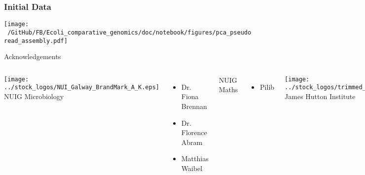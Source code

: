 \documentclass[10pt, compress]{beamer}
\begin{document}
\begin{frame}[fragile]
  \frametitle{Initial Data}
  \texttt{[image: ~/GitHub/FB/Ecoli\_comparative\_genomics/doc/notebook/figures/pca\_pseudoread\_assembly.pdf]}
\end{frame}


\begin{frame}
%

\end{frame}

\begin{frame}{Acknowledgements}
  \begin{columns}[onlytextwidth]
    \texttt{[image: ../stock\_logos/NUI\_Galway\_BrandMark\_A\_K.eps]}\\
     NUIG Microbiology
      \begin{itemize}
        \item Dr. Fiona Brennan
        \item Dr. Florence Abram
        \item Matthias Waibel
      \end{itemize}
      NUIG Maths
      \begin{itemize}
        \item Pilib
      \end{itemize}

    \texttt{[image: ../stock\_logos/trimmed\_jhi.png]}\\
      James Hutton Institute
      \begin{itemize}
        \item Leighton Pritchard
      \end{itemize}
  \end{columns}
\end{frame}



\end{document}
